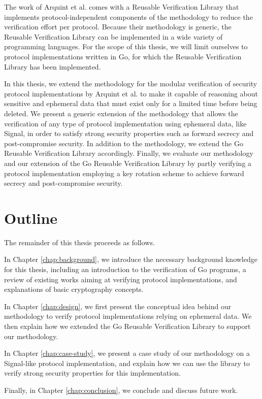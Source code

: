 The work of Arquint et al. comes with a Reusable Verification Library that implements protocol-independent components of the methodology to reduce the verification effort per protocol.
Because their methodology is generic, the Reusable Verification Library can be implemented in a wide variety of programming languages.
For the scope of this thesis, we will limit ourselves to protocol implementations written in Go, for which the Reusable Verification Library has been implemented.

In this thesis, we extend the methodology for the modular verification of security protocol implementations by Arquint et al. to make it capable of reasoning about sensitive and ephemeral data that must exist only for a limited time before being deleted.
We present a generic extension of the methodology that allows the verification of any type of protocol implementation using ephemeral data, like Signal, in order to satisfy strong security properties such as forward secrecy and post-compromise security.
In addition to the methodology, we extend the Go Reusable Verification Library accordingly.
Finally, we evaluate our methodology and our extension of the Go Reusable Verification Library by partly verifying a protocol implementation employing a key rotation scheme to achieve forward secrecy and post-compromise security.


\section{Outline}
\label{sec:outline}

The remainder of this thesis proceeds as follows.

In Chapter \ref{chap:background}, we introduce the necessary background knowledge for this thesis, including an introduction to the verification of Go programs, a review of existing works aiming at verifying protocol implementations, and explanations of basic cryptography concepts.

In Chapter \ref{chap:design}, we first present the conceptual idea behind our methodology to verify protocol implementations relying on ephemeral data. We then explain how we extended the Go Reusable Verification Library to support our methodology.

In Chapter \ref{chap:case-study}, we present a case study of our methodology on a Signal-like protocol implementation, and explain how we can use the library to verify strong security properties for this implementation.

Finally, in Chapter \ref{chap:conclusion}, we conclude and discuss future work.
